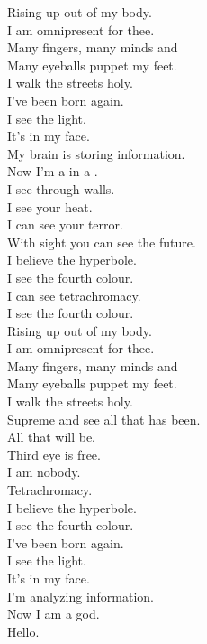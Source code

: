 Rising up out of my body. \\
I am omnipresent for thee. \\
Many fingers, many minds and \\
Many eyeballs puppet my feet. \\
I walk the streets holy. \\

I've been born again. \\
I see the light. \\
It's in my face. \\
My brain is storing information. \\
Now I'm a  in a . \\
I see through walls. \\
I see your heat. \\
I can see your terror. \\
With sight you can see the future. \\

I believe the hyperbole. \\
I see the fourth colour. \\
I can see tetrachromacy. \\
I see the fourth colour. \\

Rising up out of my body. \\
I am omnipresent for thee. \\
Many fingers, many minds and \\
Many eyeballs puppet my feet. \\
I walk the streets holy. \\
Supreme and see all that has been. \\
All that will be. \\
Third eye is free. \\
I am nobody. \\
Tetrachromacy. \\

I believe the hyperbole. \\
I see the fourth colour. \\

I've been born again. \\
I see the light. \\
It's in my face. \\
I'm analyzing information. \\
Now I am a god. \\

Hello. \\

